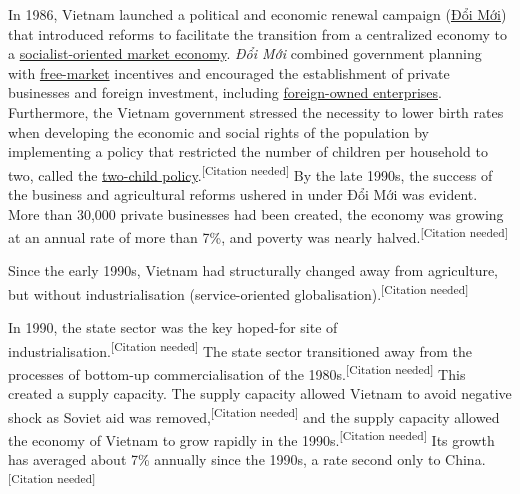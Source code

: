 \documentclass[openany]{book}
\begin{document}
In 1986, Vietnam launched a political and economic renewal campaign (\href{https://en.wikipedia.org/wiki/%C4%90%E1%BB%95i_M%E1%BB%9Bi}{Đổi Mới}) that introduced reforms to facilitate the transition from a centralized economy to a \href{https://en.wikipedia.org/wiki/Socialist-oriented_market_economy}{socialist-oriented market economy}. \textit{Đổi Mới} combined government planning with \href{https://en.wikipedia.org/wiki/Free-market}{free-market} incentives and encouraged the establishment of private businesses and foreign investment, including \href{https://en.wikipedia.org/wiki/Foreign_direct_investment}{foreign-owned enterprises}. Furthermore, the Vietnam government stressed the necessity to lower birth rates when developing the economic and social rights of the population by implementing a policy that restricted the number of children per household to two, called the \href{https://en.wikipedia.org/wiki/Two-child_policy}{two-child policy}.\textsuperscript{[Citation needed]} By the late 1990s, the success of the business and agricultural reforms ushered in under Đổi Mới was evident. More than 30,000 private businesses had been created, the economy was growing at an annual rate of more than 7\%, and poverty was nearly halved.\textsuperscript{[Citation needed]}

Since the early 1990s, Vietnam had structurally changed away from agriculture, but without industrialisation (service-oriented globalisation).\textsuperscript{[Citation needed]}

In 1990, the state sector was the key hoped-for site of \\industrialisation.\textsuperscript{[Citation needed]} The state sector transitioned away from the processes of bottom-up commercialisation of the 1980s.\textsuperscript{[Citation needed]} This created a supply capacity. The supply capacity allowed Vietnam to avoid negative shock as Soviet aid was removed,\textsuperscript{[Citation needed]} and the supply capacity allowed the economy of Vietnam to grow rapidly in the 1990s.\textsuperscript{[Citation needed]} Its growth has averaged about 7\% annually since the 1990s, a rate second only to China.\textsuperscript{[Citation needed]}
\end{document}
